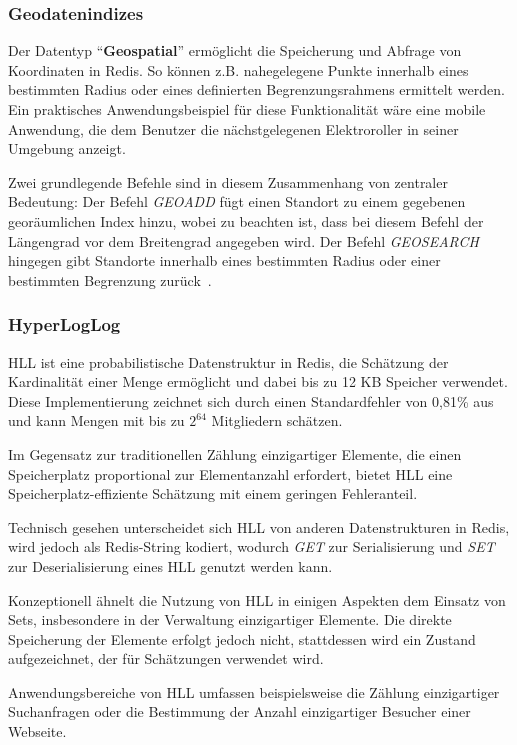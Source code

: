 \subsubsection{Geodatenindizes}
Der Datentyp \enquote{\textbf{Geospatial}} ermöglicht die Speicherung und Abfrage von Koordinaten in Redis. So können z.B. nahegelegene Punkte innerhalb eines bestimmten Radius oder eines definierten Begrenzungsrahmens ermittelt werden.
Ein praktisches Anwendungsbeispiel für diese Funktionalität wäre eine mobile Anwendung, die dem Benutzer die nächstgelegenen Elektroroller in seiner Umgebung anzeigt.

Zwei grundlegende Befehle sind in diesem Zusammenhang von zentraler Bedeutung: Der Befehl \emph{GEOADD} fügt einen Standort zu einem gegebenen georäumlichen Index hinzu, wobei zu beachten ist, dass bei diesem Befehl der Längengrad vor dem Breitengrad angegeben wird. Der Befehl \emph{GEOSEARCH} hingegen gibt Standorte innerhalb eines bestimmten Radius oder einer bestimmten Begrenzung zurück~\cite{redis_ltd_geospatial_nodate}.





\subsubsection{HyperLogLog}
\ac{HLL} ist eine probabilistische Datenstruktur in Redis, die Schätzung der Kardinalität einer Menge ermöglicht und dabei bis zu 12 KB Speicher verwendet. Diese Implementierung zeichnet sich durch einen Standardfehler von 0,81\% aus und kann Mengen mit bis zu \(2^{64}\) Mitgliedern schätzen.

Im Gegensatz zur traditionellen Zählung einzigartiger Elemente, die einen Speicherplatz proportional zur Elementanzahl erfordert, bietet \ac{HLL} eine Speicherplatz-effiziente Schätzung mit einem geringen Fehleranteil.

Technisch gesehen unterscheidet sich \ac{HLL} von anderen Datenstrukturen in Redis, wird jedoch als Redis-String kodiert, wodurch \emph{GET} zur Serialisierung und \emph{SET} zur Deserialisierung eines \ac{HLL} genutzt werden kann.

Konzeptionell ähnelt die Nutzung von \ac{HLL} in einigen Aspekten dem Einsatz von Sets, insbesondere in der Verwaltung einzigartiger Elemente. Die direkte Speicherung der Elemente erfolgt jedoch nicht, stattdessen wird ein Zustand aufgezeichnet, der für Schätzungen verwendet wird.

Anwendungsbereiche von \ac{HLL} umfassen beispielsweise die Zählung einzigartiger Suchanfragen oder die Bestimmung der Anzahl einzigartiger Besucher einer Webseite.

